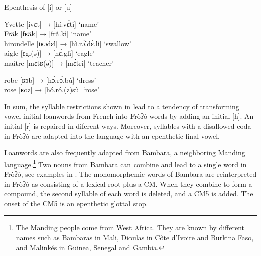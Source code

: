 \documentclass[output=paper]{langscibook}
\begin{document}
\begin{exe}
    \ex Epenthesis of [i] or [u]\label{ex:traore:44}\\
    \begin{xlist}
        \ex \label{ex:traore:44a}
        \begin{xlist}
        \ex Yvette             [ivɛt]              →         [hí.vɛ́tì]           ‘name’\\
        \ex Frãk              [fʁãk]             →         [frã́.kì]           ‘name’\\
        \ex hirondelle        [iʁɔdɛl]          →         [hì.rɔ̃̀.dɛ́.lì]       ‘swallow’  \\
        \ex aigle               [ɛgl(ə)]          →         [hɛ́.glì]           ‘eagle’\\
        \ex maître             [mɛtʁ(ə)]        →         [mɛ́trì]           ‘teacher’\\
        \end{xlist}
        \ex \label{ex:traore:44b}
        \begin{xlist}
          \ex robe               [ʁɔb]              →         [hɔ́.rɔ́.bù]       ‘dress’\\
          \ex rose               [ʁoz]              →         [hó.ró.(z)sù]     ‘rose’\\
        \end{xlist}
     \end{xlist}
\end{exe}

In sum, the syllable restrictions shown in  lead to a tendency of transforming vowel initial loanwords from French into Fròʔò words by adding an initial [h]. An initial [r] is repaired in diferent ways. Moreover, syllables with a disallowed coda in Fròʔò are adapted into the language with an epenthetic final vowel.

Loanwords are also frequently adapted from Bambara, a neighboring Manding language.\footnote{The Manding people come from West Africa. They are known by different names such as Bambaras in Mali, Dioulas in Côte d'Ivoire and Burkina Faso, and Malinkés in Guinea, Senegal and Gambia.}  Two nouns from Bambara can combine and lead to a single word in Fròʔò, see examples in . The monomorphemic words of Bambara are reinterpreted in Fròʔò as consisting of a lexical root plus a CM. When they combine to form a compound, the second syllable of each word is deleted, and a CM5 is added. The onset of the CM5 is an epenthetic glottal stop.  
\end{document}
